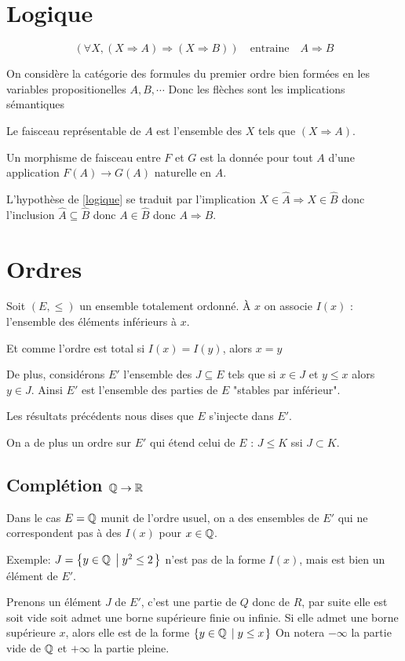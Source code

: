 \documentclass[12pt,makeidx, draft]{amsart}
\begin{document}
\section{Logique}
\begin{equation}\label{logique}
( \forall X, (X \Rightarrow A) \Rightarrow (X \Rightarrow B))
\quad
\text{entraine}
\quad
A \Rightarrow B
\end{equation}

On considère la catégorie des formules du premier ordre bien formées en les variables propositionelles $A,B,\cdots$
Donc les flèches sont les implications sémantiques

Le faisceau représentable de $A$ est l'ensemble des $X$ tels que $(X\Rightarrow A)$.

Un morphisme de faisceau entre $F$ et $G$ est la donnée pour tout $A$ d'une application $F(A) \to G(A)$ naturelle en $A$.

L'hypothèse de \eqref{logique} se traduit par l'implication $X \in \hat{A} \Rightarrow X \in \hat{B}$ donc l'inclusion $\hat{A} \subseteq \hat{B}$ donc $A \in \hat{B}$ donc $A \Rightarrow B$.

\section{Ordres}

Soit $(E,\leq)$ un ensemble totalement ordonné.
À $x$ on associe $I(x)$ : l'ensemble des éléments inférieurs à $x$.

Et comme l'ordre est total si $I(x) = I(y)$, alors $x=y$

De plus, considérons $E'$ l'ensemble des $J \subseteq E$ tels que si $x \in J$ et $y \leq x$ alors $y \in J$. Ainsi $E'$ est l'ensemble des parties de $E$ "stables par inférieur".

Les résultats précédents nous dises que $E$ s'injecte dans $E'$.

On a de plus un ordre sur $E'$ qui étend celui de $E$ : 
$J \leq K$ ssi $J \subset K$.
\subsection{Complétion $\mathbb{Q} \to \mathbb{R}$}
Dans le cas $E = \mathbb{Q}$ munit de l'ordre usuel,
on a des ensembles de $E'$ qui ne correspondent pas à des $I(x)$ pour $x \in \mathbb{Q}$.

Exemple: $J = \left\lbrace {y \in \mathbb{Q}} \; \left| \; {y^2 \leq 2} \right. \right\rbrace$ n'est pas de la forme $I(x)$, mais est bien un élément de $E'$.

Prenons un élément $J$ de $E'$, c'est une partie de $Q$ donc de $R$, par suite elle est soit vide soit admet une borne supérieure finie ou infinie. Si elle admet une borne supérieure $x$, alors elle est de la forme $\left\lbrace {y\in \mathbb{Q}} \; \left| \; {y \leq x} \right. \right\rbrace$
On notera $-\infty$ la partie vide de $\mathbb{Q}$ et $+\infty$ la partie pleine.
\end{document}
